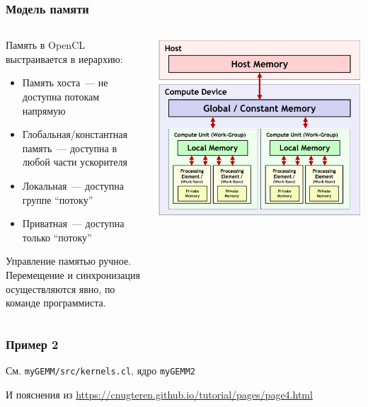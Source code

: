 \documentclass[
    aspectratio=169,
]{beamer}
\begin{document}
\begin{frame}
    \frametitle{Модель памяти}

    \begin{columns}[T]
        \begin{column}{0.5\textwidth}
            Память в OpenCL выстраивается в иерархию:
            \begin{itemize}
                \item Память хоста~--- не доступна потокам напрямую
                \item Глобальная/константная память~--- доступна в любой части ускорителя
                \item Локальная~--- доступна группе \enquote{потоку}
                \item Приватная~--- доступна только \enquote{потоку}
            \end{itemize}
            Управление памятью ручное.
            Перемещение и синхронизация осуществляются явно, по команде программиста.
        \end{column}
        \begin{column}{0.5\textwidth}
            \includegraphics[width=\linewidth]{memory_model.jpg}
        \end{column}
    \end{columns}

\end{frame}

\begin{frame}
    \frametitle{Пример 2}

    См. \texttt{myGEMM/src/kernels.cl}, ядро \texttt{myGEMM2}

    И пояснения из \url{https://cnugteren.github.io/tutorial/pages/page4.html}

\end{frame}
\end{document}
